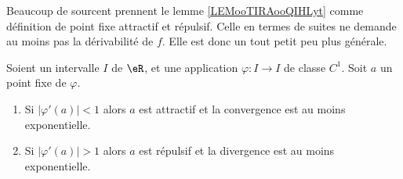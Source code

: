 \begin{normaltext}
	Beaucoup de sourcent prennent le lemme \ref{LEMooTIRAooQIHLyt} comme définition de point fixe attractif et répulsif. Celle en termes de suites ne demande au moins pas la dérivabilité de \( f\). Elle est donc un tout petit peu plus générale.
\end{normaltext}

\begin{lemma}		\label{LEMooTIRAooQIHLyt}
	Soient un intervalle \( I\) de \( \eR\), et une application \(\varphi \colon I\to I  \) de classe \( C^1\). Soit \( a\) un point fixe de \( \varphi\).
	\begin{enumerate}
		\item
		      Si \( | \varphi'(a) |<1\) alors \( a\) est attractif et la convergence est au moins exponentielle.
		\item
		      Si \( | \varphi'(a) |>1\) alors \( a\) est répulsif et la divergence est au moins exponentielle.
	\end{enumerate}
\end{lemma}

